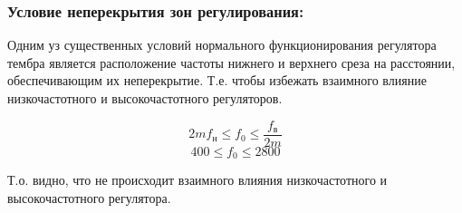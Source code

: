 
\subsubsection{Условие неперекрытия зон регулирования:} %
Одним уз существенных условий нормального функционирования регулятора тембра является расположение частоты нижнего и верхнего среза на расстоянии, обеспечивающим их неперекрытие. Т.е. чтобы избежать взаимного влияние низкочастотного и высокочастотного регуляторов. \par

  \begin{equation}
    \label{eq:equation5_3}
      2 m f_{\text{н}} \leq f_0 \leq \dfrac{f_{\text{в}}}{2m} 
 \end{equation} 
 \begin{equation}
   \label{eq:equation5_4}
     400 \leq f_0 \leq 2800
  \end{equation} 

    Т.о. видно, что не происходит взаимного влияния низкочастотного и высокочастотного регулятора.

